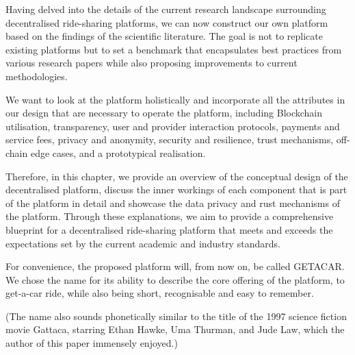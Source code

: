 Having delved into the details of the current research landscape surrounding decentralised ride-sharing platforms, we can now construct our own platform based on the findings of the scientific literature. The goal is not to replicate existing platforms but to set a benchmark that encapsulates best practices from various research papers while also proposing improvements to current methodologies.

We want to look at the platform holistically and incorporate all the attributes in our design that are necessary to operate the platform, including Blockchain utilisation, transparency, user and provider interaction protocols, payments and service fees, privacy and anonymity, security and resilience, trust mechanisms, off-chain edge cases, and a prototypical realisation.

Therefore, in this chapter, we provide an overview of the conceptual design of the decentralised platform, discuss the inner workings of each component that is part of the platform in detail and showcase the data privacy and rust mechanisms of the platform.
Through these explanations, we aim to provide a comprehensive blueprint for a decentralised ride-sharing platform that meets and exceeds the expectations set by the current academic and industry standards.

For convenience, the proposed platform will, from now on, be called GETACAR. We chose the name for its ability to describe the core offering of the platform, to get-a-car ride, while also being short, recognisable and easy to remember.

(The name also sounds phonetically similar to the title of the 1997 science fiction movie Gattaca, starring Ethan Hawke, Uma Thurman, and Jude Law, which the author of this paper immensely enjoyed.)
